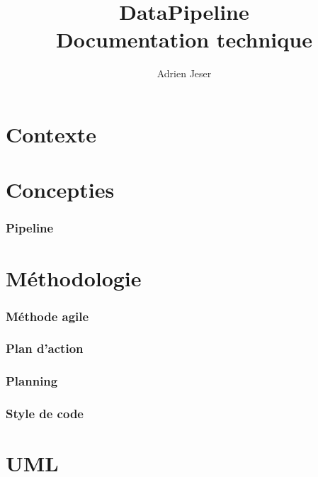 \documentclass{article}
\title{DataPipeline \\ Documentation technique}
\author{Adrien Jeser}
\begin{document}
\maketitle
\newpage
\tableofcontents
\newpage

\section{Contexte}
\label{sec:context}

\section{Concepties}
\label{sec:concepts}

\subsubsection{Pipeline}
\label{ssub:pipeline}

\section{Méthodologie}
\label{sec:methodology}

\subsubsection{Méthode agile}
\label{ssub:agil_method}

\subsubsection{Plan d'action}
\label{ssub:Action plan}

\subsubsection{Planning}
\label{ssub:planning}

\subsubsection{Style de code}
\label{ssub:style_coding}

\section{UML}
\label{sec:uml}
\end{document}
